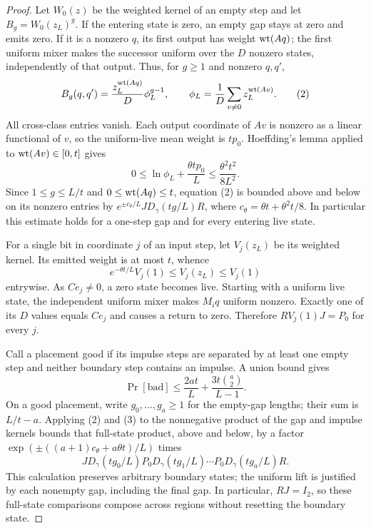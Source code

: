 \begin{proof}
Let $W_0(z)$ be the weighted kernel of an empty step and let
$B_g=W_0(z_L)^g$. If the entering state is zero, an empty gap stays at
zero and emits zero. If it is a nonzero $q$, its first output has weight
$\operatorname{wt}(Aq)$; the first uniform mixer makes the successor uniform over the
$D$ nonzero states, independently of that output. Thus, for $g\ge1$
and nonzero $q,q'$,
\[
 B_g(q,q')=\frac{z_L^{\operatorname{wt}(Aq)}}D\phi_L^{g-1},\qquad
 \phi_L=\frac1D\sum_{v\ne0}z_L^{\operatorname{wt}(Av)}.
 \tag{2}
\]
All cross-class entries vanish. Each output coordinate of $Av$ is
nonzero as a linear functional of $v$, so the uniform-live mean weight
is $t p_0$. Hoeffding's lemma applied to $\operatorname{wt}(Av)\in[0,t]$ gives
\[
 0\le\ln\phi_L+\frac{\theta tp_0}{L}
 \le\frac{\theta^2t^2}{8L^2}.
\]
Since $1\le g\le L/t$ and $0\le\operatorname{wt}(Aq)\le t$, equation (2) is
bounded above and below on its nonzero entries by
$e^{\pm c_\theta/L}JD_\gamma(tg/L)R$, where
$c_\theta=\theta t+\theta^2t/8$. In particular this estimate holds
for a one-step gap and for every entering live state.

For a single bit in coordinate $j$ of an input step, let $V_j(z_L)$
be its weighted kernel. Its emitted weight is at most $t$, whence
\[
 e^{-\theta t/L}V_j(1)\le V_j(z_L)\le V_j(1)
 \tag{3}
\]
entrywise. As $Ce_j\ne0$, a zero state becomes live. Starting with a
uniform live state, the independent uniform mixer makes $M_iq$
uniform nonzero. Exactly one of its $D$ values equals $Ce_j$ and
causes a return to zero. Therefore
$RV_j(1)J=P_0$ for every $j$.

Call a placement good if its impulse steps are separated by at least
one empty step and neither boundary step contains an impulse. A union
bound gives
\[
 \Pr[\mathrm{bad}]
 \le\frac{2at}{L}+\frac{3t\binom a2}{L-1}.
 \tag{4}
\]
On a good placement, write $g_0,\ldots,g_a\ge1$ for the empty-gap
lengths; their sum is $L/t-a$. Applying (2) and (3) to the nonnegative
product of the gap and impulse kernels bounds that full-state product,
above and below, by a factor
$\exp(\pm((a+1)c_\theta+a\theta t)/L)$ times
\[
 J D_\gamma(tg_0/L)P_0D_\gamma(tg_1/L)
   \cdots P_0D_\gamma(tg_a/L)R.
 \tag{5}
\]
This calculation preserves arbitrary boundary states; the uniform
lift is justified by each nonempty gap, including the final gap.
In particular, $RJ=I_2$, so these full-state comparisons compose
across regions without resetting the boundary state.


\end{proof}

